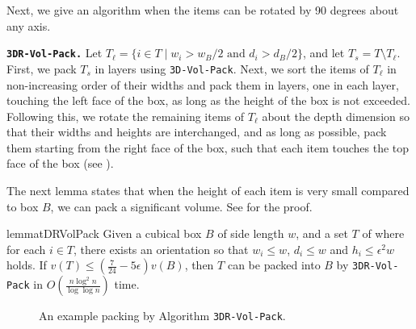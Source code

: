 Next, we give an algorithm when the items can be rotated by 90 degrees about any axis.

\noindent \textbf{\texttt{3DR-Vol-Pack.}}
Let $T_{\ell} = \{i\in T \mid w_i > w_B/2 \text{ and } d_i > d_B/2\}$, and let $T_s = T\setminus T_{\ell}$. First, we pack $T_s$ in layers 
using \texttt{3D-Vol-Pack}. Next, we sort the items of $T_{\ell}$ in non-increasing order of their widths and pack them in layers, 
one in each layer, touching the left face of the box, as long as the height of the box is not exceeded. Following this, 
we rotate the remaining items of $T_{\ell}$ about the depth dimension so that their widths and heights are interchanged, and as 
long as possible, pack them  starting from the right face of the box, such that each item touches the top face of the box (see ). 

The next lemma states that when  the height of each item is very small compared to box $B$, we can pack a significant volume.
See  for the proof.




\begin{restatable}{lemma}{tDRVolPack}
\label{lem:3DRVolPack}
    Given a cubical box $B$ of side length $w$,
    and a set $T$ of  where for each $i\in T$, there exists an orientation so that $w_i \le w$, $d_i \le w$ and $h_i \le \epsilon^2 w$ holds. 
    If $v(T) \le \left(\frac{7}{24}-5\epsilon\right)v(B)$, then $T$ can be packed into $B$ by \texttt{3DR-Vol-Pack} in $O\left(\frac{n \log^2 n}{\log \log n}\right)$ time.
\end{restatable}
\begin{figure}
    \centering
    
    \caption{An example packing by Algorithm \texttt{3DR-Vol-Pack}.}
    \label{fig:3d-r-vol-pack}
\end{figure}

